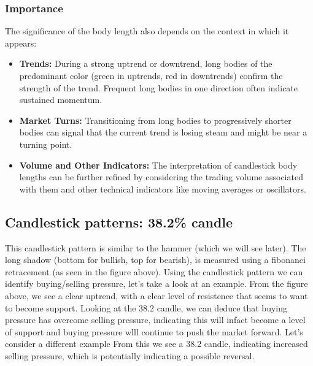 \documentclass{report}
\begin{document}
     \subsubsection{Importance}
     \bigbreak \noindent 
     The significance of the body length also depends on the context in which it appears:
     \begin{itemize}
         \item \textbf{Trends:} During a strong uptrend or downtrend, long bodies of the predominant color (green in uptrends, red in downtrends) confirm the strength of the trend. Frequent long bodies in one direction often indicate sustained momentum.
         \item \textbf{Market Turns:} Transitioning from long bodies to progressively shorter bodies can signal that the current trend is losing steam and might be near a turning point.
         \item \textbf{Volume and Other Indicators:} The interpretation of candlestick body lengths can be further refined by considering the trading volume associated with them and other technical indicators like moving averages or oscillators.
     \end{itemize}

     \bigbreak \noindent 
     \subsection{Candlestick patterns: 38.2\% candle}
     \bigbreak \noindent 
     \bigbreak \noindent 
     This candlestick pattern is similar to the hammer (which we will see later). The long shadow (bottom for bullish, top for bearish), is measured using a fibonanci retracement (as seen in the figure above). 
     \bigbreak \noindent 
     Using the candlestick pattern we can identify buying/selling pressure, let's take a look at an example.
     \bigbreak \noindent 
     \bigbreak \noindent 
     From the figure above, we see a clear uptrend, with a clear level of resistence that seems to want to become support. Looking at the 38.2 candle, we can deduce that buying pressure has overcome selling pressure, indicating this will infact become a level of support and buying pressure wlll continue to push the market forward.
     \bigbreak \noindent 
     Let's consider a different example
     \bigbreak \noindent 
     \bigbreak \noindent 
     From this we see a 38.2 candle, indicating increased selling pressure, which is potentially indicating a possible reversal.
\end{document}
